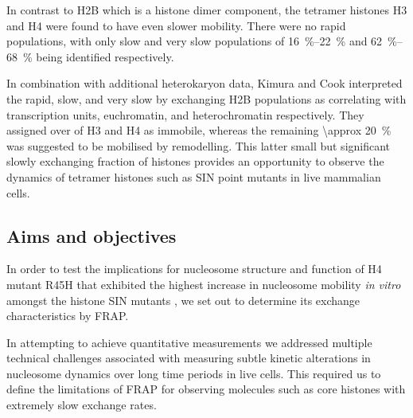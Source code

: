     In contrast to H2B which is a histone dimer component, the tetramer
    histones H3 and H4 were found to have even slower mobility.  There
    were no rapid populations, with only slow and very slow populations
    of \SIrange{16}{22}{\percent} and \SIrange{62}{68}{\percent} being
    identified respectively.

    In combination with additional heterokaryon data, Kimura and Cook
    interpreted the rapid, slow, and very slow by exchanging H2B
    populations as correlating with transcription units, euchromatin,
    and heterochromatin respectively.  They assigned over 
    of H3 and H4 as immobile, whereas the remaining
    \SI{\approx 20}{\percent} was suggested to be mobilised by
    remodelling.  This latter small but significant
    slowly exchanging fraction of histones
    provides an opportunity to observe the dynamics of
    tetramer histones such as SIN point mutants in live mammalian cells.


  \subsection{Aims and objectives}

    In order to test the implications for nucleosome structure and function
    of H4 mutant R45H that exhibited the highest increase
    in nucleosome mobility \textit{in vitro} amongst
    the histone SIN mutants \citep{flaus2004sin},
    we set out to determine its exchange characteristics by FRAP.

    In attempting to achieve quantitative measurements
    we addressed multiple technical challenges associated with
    measuring subtle kinetic alterations in nucleosome dynamics
    over long time periods in live cells.
    This required us to define the limitations of FRAP for observing molecules
    such as core histones with extremely slow exchange rates.

